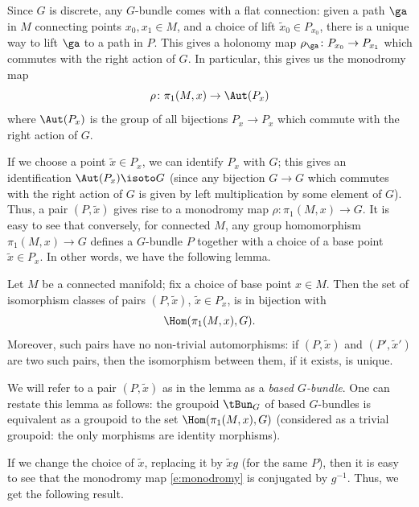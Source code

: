 Since $G$ is discrete, any $G$-bundle comes with a flat connection: given a
path $\ga$ in $M$ connecting points $x_0, x_1\in M$, and a choice of lift
$\tilde x_0\in P_{x_0}$, there is a unique way to lift $\ga$ to a path in $P$.
This gives a holonomy map $\rho_\ga \colon P_{x_0} \to P_{x_1}$ which commutes
with the right action of $G$. In particular, this gives us the monodromy map
\begin{equation}\label{e:monodromy}
  \rho \colon \pi_1(M,x)\to \Aut(P_x)
\end{equation}
where $\Aut(P_x)$ is the group of all bijections $P_x\to P_x$ which commute with
the right action of $G$.

If we choose a point $\tilde x\in P_x$, we can identify $P_x$ with $G$;
this gives an identification $\Aut(P_x)\isoto G$ (since any bijection $G\to G$
which commutes with the right action of $G$ is given by left multiplication
by some element of $G$). Thus, a pair $(P, \tilde x)$ gives rise to a
monodromy map $\rho \colon \pi_1(M,x)\to G$. It is easy to see that
conversely, for connected $M$, any group homomorphism $\pi_1(M,x)\to G$
defines a $G$-bundle $P$ together with a choice of a base point $\tilde x
\in P_x$. In other words, we have the following lemma.

\begin{lemma}\label{l:monodromy1}
  Let $M$ be a connected manifold; fix a choice of base point $x\in M$.
  Then the set of isomorphism classes of pairs $(P, \tilde x)$,
  $\tilde x\in P_x$, is in bijection with
  $$
  \Hom(\pi_1(M,x),G).
  $$
  Moreover, such pairs have no non-trivial automorphisms: if $(P, \tilde x)$
  and $(P', \tilde x')$ are two such pairs, then the isomorphism between them,
  if it exists, is unique.
\end{lemma}

We will refer to a pair $(P, \tilde x)$ as in the lemma as a
\emph{based $G$-bundle}. One can restate
this lemma as follows: the groupoid $\tBun_G$
of based $G$-bundles is equivalent as a groupoid to the set
$\Hom(\pi_1(M,x), G)$ (considered as a trivial groupoid: the only morphisms
are identity morphisms).

If we change the choice of $\tilde x$, replacing it by $\tilde x g$ (for
the same $P$), then it is easy to see that the monodromy map
\eqref{e:monodromy} is conjugated by $g^{-1}$. Thus, we get the following
result.

